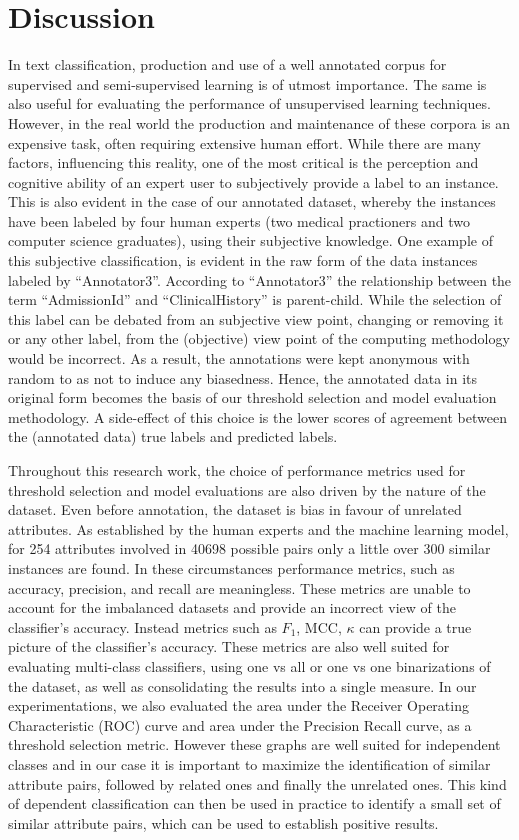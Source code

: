 \documentclass{ieeeaccess}
\begin{document}
\section{Discussion}
In text classification, production and use of a well annotated corpus for supervised and semi-supervised learning is of utmost importance. The same is also useful for evaluating the performance of unsupervised learning techniques. However, in the real world the production and maintenance of these corpora is an expensive task, often requiring extensive human effort. While there are many factors, influencing this reality, one of the most critical is the perception and cognitive ability of an expert user to subjectively provide a label to an instance. This is also evident in the case of our annotated dataset, whereby the instances have been labeled by four human experts (two medical practioners and two computer science graduates), using their subjective knowledge. One example of this subjective classification, is evident in the raw form of the data instances labeled by ``Annotator3''. According to ``Annotator3'' the relationship between the term ``AdmissionId'' and ``ClinicalHistory'' is parent-child. While the selection of this label can be debated from an subjective view point, changing or removing it or any other label, from the (objective) view point of the computing methodology would be incorrect. As a result, the annotations were kept anonymous with random to as not to induce any biasedness. Hence, the annotated data in its original form becomes the basis of our threshold selection and model evaluation methodology. A side-effect of this choice is the lower scores of agreement between the (annotated data) true labels and predicted labels.

Throughout this research work, the choice of performance metrics used for threshold selection and model evaluations are also driven by the nature of the dataset. Even before annotation, the dataset is bias in favour of unrelated attributes. As established by the human experts and the machine learning model, for 254 attributes involved in 40698 possible pairs only a little over 300 similar instances are found. In these circumstances performance metrics, such as accuracy, precision, and recall are meaningless. These metrics are unable to account for the imbalanced datasets and provide an incorrect view of the classifier's accuracy. Instead metrics such as $F_1$, MCC, $\kappa$ can provide a true picture of the classifier's accuracy. These metrics are also well suited for evaluating multi-class classifiers, using one vs all or one vs one binarizations of the dataset, as well as consolidating the results into a single measure. In our experimentations, we also evaluated the area under the Receiver Operating Characteristic (ROC) curve and area under the Precision Recall curve, as a threshold selection metric. However these graphs are well suited for independent classes and in our case it is important to maximize the identification of similar attribute pairs, followed by related ones and finally the unrelated ones. This kind of dependent classification can then be used in practice to identify a small set of similar attribute pairs, which can be used to establish positive results.
\end{document}
